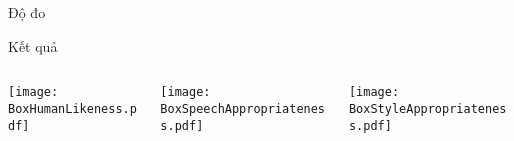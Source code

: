 \begin{frame}{Độ đo}
%	
\end{frame}
\begin{frame}{Kết quả}
	\begin{columns}
	\begin{column}{0.33\textwidth}
		\texttt{[image: BoxHumanLikeness.pdf]}
	\end{column}
	
	\begin{column}{0.33\textwidth}
		\texttt{[image: BoxSpeechAppropriateness.pdf]}
	\end{column}
	
	\begin{column}{0.33\textwidth}
		\texttt{[image: BoxStyleAppropriateness.pdf]}
	\end{column}
\end{columns}

%



\end{frame}
